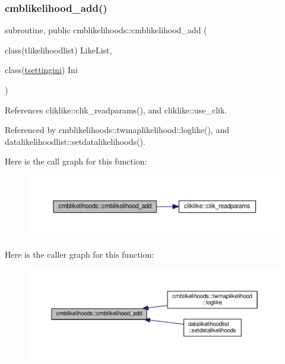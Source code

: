 \subsubsection{\texorpdfstring{cmblikelihood\+\_\+add()}{cmblikelihood\_add()}}
{\footnotesize\ttfamily subroutine, public cmblikelihoods\+::cmblikelihood\+\_\+add (\begin{DoxyParamCaption}\item[{class(tlikelihoodlist)}]{Like\+List,  }\item[{class(\mbox{\hyperlink{structsettings_1_1tsettingini}{tsettingini}})}]{Ini }\end{DoxyParamCaption})}



References cliklike\+::clik\+\_\+readparams(), and cliklike\+::use\+\_\+clik.



Referenced by cmblikelihoods\+::twmaplikelihood\+::loglike(), and datalikelihoodlist\+::setdatalikelihoods().

Here is the call graph for this function\+:
\nopagebreak
\begin{figure}[H]
\begin{center}
\leavevmode
\includegraphics[width=350pt]{namespacecmblikelihoods_a6b235ad1e7fa8ebc5304542f01584617_cgraph}
\end{center}
\end{figure}
Here is the caller graph for this function\+:
\nopagebreak
\begin{figure}[H]
\begin{center}
\leavevmode
\includegraphics[width=350pt]{namespacecmblikelihoods_a6b235ad1e7fa8ebc5304542f01584617_icgraph}
\end{center}
\end{figure}
\mbox{\label{namespacecmblikelihoods_ac2d0805940347a1cc9fc6d7ef007e082}} 
